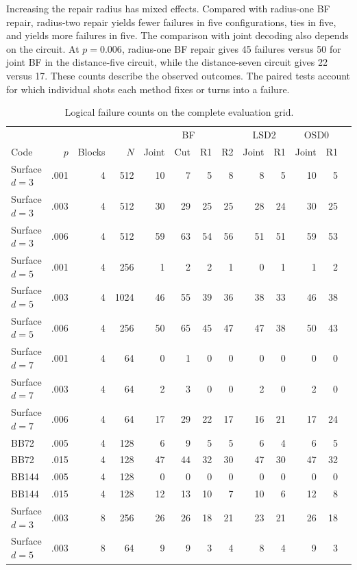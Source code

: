 Increasing the repair radius has mixed effects. Compared with radius-one BF repair, radius-two repair yields fewer failures in five configurations, ties in five, and yields more failures in five. The comparison with joint decoding also depends on the circuit. At $p=0.006$, radius-one BF repair gives 45 failures versus 50 for joint BF in the distance-five circuit, while the distance-seven circuit gives 22 versus 17. These counts describe the observed outcomes. The paired tests account for which individual shots each method fixes or turns into a failure.

\begin{table}[t]\centering\scriptsize
\caption{Logical failure counts on the complete evaluation grid.}\label{tab:failgrid}
\begin{tabular}{lrrrrrrrrrrrr}\toprule
&&&&\multicolumn{4}{c}{BF}&\multicolumn{2}{c}{LSD2}&\multicolumn{2}{c}{OSD0}\\
Code&$p$&Blocks&$N$&Joint&Cut&R1&R2&Joint&R1&Joint&R1\\\midrule
Surface $d=3$&.001&4&512&10&7&5&8&8&5&10&5\\
Surface $d=3$&.003&4&512&30&29&25&25&28&24&30&25\\
Surface $d=3$&.006&4&512&59&63&54&56&51&51&59&53\\
Surface $d=5$&.001&4&256&1&2&2&1&0&1&1&2\\
Surface $d=5$&.003&4&1024&46&55&39&36&38&33&46&38\\
Surface $d=5$&.006&4&256&50&65&45&47&47&38&50&43\\
Surface $d=7$&.001&4&64&0&1&0&0&0&0&0&0\\
Surface $d=7$&.003&4&64&2&3&0&0&2&0&2&0\\
Surface $d=7$&.006&4&64&17&29&22&17&16&21&17&24\\
BB72&.005&4&128&6&9&5&5&6&4&6&5\\
BB72&.015&4&128&47&44&32&30&47&30&47&32\\
BB144&.005&4&128&0&0&0&0&0&0&0&0\\
BB144&.015&4&128&12&13&10&7&10&6&12&8\\
Surface $d=3$&.003&8&256&26&26&18&21&23&21&26&18\\
Surface $d=5$&.003&8&64&9&9&3&4&8&4&9&3\\\bottomrule
\end{tabular}\end{table}
